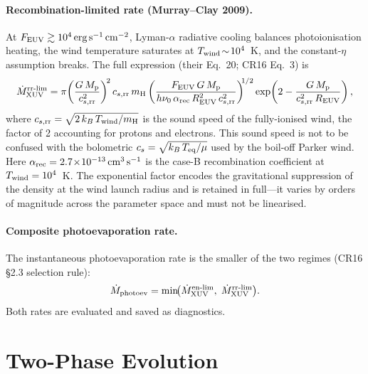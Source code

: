 \documentclass{aastex701}
\newcommand{\Mdot}{\dot{M}}
\newcommand{\Mp}{M_{\rm p}}
\newcommand{\Teq}{T_{\rm eq}}
\begin{document}
\paragraph{Recombination-limited rate (Murray--Clay 2009).}  At
$F_{\rm EUV}\gtrsim 10^{4}\,{\rm erg\,s^{-1}\,cm^{-2}}$, Lyman-$\alpha$
radiative cooling balances photoionisation heating, the wind
temperature saturates at $T_{\rm wind}\!\sim\!10^{4}$~K, and the
constant-$\eta$ assumption breaks.  The full
\citet{MurrayClay2009} expression (their Eq.~20; CR16 Eq.~3) is
\begin{equation}\label{eq:mdot_rr}
  \Mdot_{\rm XUV}^{\rm rr\text{-}lim}
    = \pi\!\left(\frac{G\,\Mp}{c_{s,{\rm rr}}^{2}}\right)^{\!2}
      c_{s,{\rm rr}}\,m_{\rm H}\,
      \!\left(\frac{F_{\rm EUV}\,G\,\Mp}
                   {h\nu_{0}\,\alpha_{\rm rec}\,
                    R_{\rm EUV}^{2}\,c_{s,{\rm rr}}^{2}}\right)^{\!\!1/2}
      \exp\!\left(2 - \frac{G\,\Mp}{c_{s,{\rm rr}}^{2}\,R_{\rm EUV}}\right),
\end{equation}
where $c_{s,{\rm rr}} = \sqrt{2\,k_{B}\,T_{\rm wind}/m_{\rm H}}$ is the
sound speed of the fully-ionised wind, the factor of 2 accounting for
protons and electrons.  This sound speed is not to be confused with the
bolometric $c_{s} = \sqrt{k_{B}\,\Teq/\mu}$ used by the boil-off Parker
wind.  Here $\alpha_{\rm rec} = 2.7\!\times\!10^{-13}\,{\rm cm^{3}\,s^{-1}}$
is the case-B recombination coefficient at $T_{\rm wind} = 10^{4}$~K.
The exponential factor encodes the gravitational suppression of the
density at the wind launch radius and is retained in full---it varies
by orders of magnitude across the parameter space and must not be
linearised.

\paragraph{Composite photoevaporation rate.}  The instantaneous
photoevaporation rate is the smaller of the two regimes (CR16 \S2.3
selection rule):
\begin{equation}\label{eq:mdot_photoev}
  \Mdot_{\rm photoev}
    = \min\!\bigl(\Mdot_{\rm XUV}^{\rm en\text{-}lim},\;
                   \Mdot_{\rm XUV}^{\rm rr\text{-}lim}\bigr).
\end{equation}
Both rates are evaluated and saved as diagnostics.

\section{Two-Phase Evolution}\label{sec:phases}
\end{document}
